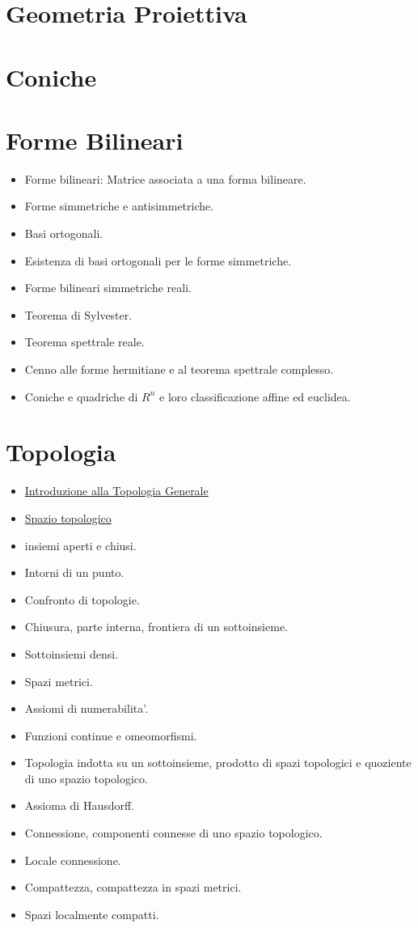 \documentclass[a4paper,10pt]{article}
\begin{document}
\section{Geometria Proiettiva}

\section{Coniche}

\section{Forme Bilineari}
  \begin{itemize}
   \item Forme bilineari: Matrice associata a una forma bilineare. 
   \item Forme simmetriche e antisimmetriche. 
   \item Basi ortogonali. 
   \item Esistenza di basi ortogonali per le forme simmetriche. 
   \item Forme bilineari simmetriche reali. 
   \item Teorema di Sylvester. 
   \item Teorema spettrale reale. 
   \item Cenno alle forme hermitiane e al teorema spettrale complesso.  
   \item Coniche e quadriche di $R^n$ e loro classificazione affine ed euclidea.
  \end{itemize}
  
\section{Topologia}
  \begin{itemize}
   \item \href{Topologia.html}{Introduzione alla Topologia Generale}
   \item \href{SpazioTopologico.html}{Spazio topologico}
   \item insiemi aperti e chiusi. 
   \item Intorni di un punto. 
   \item Confronto di topologie. 
   \item Chiusura, parte interna, frontiera di un sottoinsieme. 
   \item Sottoinsiemi densi. 
   \item Spazi metrici. 
   \item Assiomi di numerabilita'. 
   \item Funzioni continue e omeomorfismi. 
   \item Topologia indotta su un sottoinsieme, prodotto di spazi topologici e quoziente di uno spazio topologico.  
   \item Assioma di Hausdorff.  
   \item Connessione, componenti connesse di uno spazio topologico. 
   \item Locale connessione. 
   \item Compattezza, compattezza in spazi metrici. 
   \item Spazi localmente compatti. 
  \end{itemize}
\end{document}
